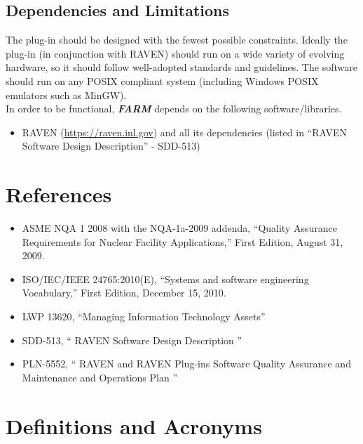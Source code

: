 \subsection{Dependencies and Limitations}
The plug-in should be designed with the fewest possible constraints. 
Ideally the  plug-in (in conjunction with RAVEN)
 should run on a wide variety of evolving hardware, 
so it should follow well-adopted standards and guidelines. The software
 should run on any POSIX compliant system (including Windows POSIX 
 emulators such as MinGW). 
\\In order to be functional, \textit{\textbf{FARM}} depends on the following software/libraries.
\begin{itemize}
  \item RAVEN (\url{https://raven.inl.gov}) and all its dependencies (listed in ``RAVEN Software Design Description'' - SDD-513)
\end{itemize}


\section{References}

\begin{itemize}

  \item ASME NQA 1 2008 with the NQA-1a-2009 addenda, ``Quality Assurance Requirements for Nuclear Facility Applications,'' First Edition, August 31, 2009.
  \item ISO/IEC/IEEE 24765:2010(E), ``Systems and software engineering Vocabulary,'' First Edition, December 15, 2010.
  \item LWP 13620, ``Managing Information Technology Assets''
  \item SDD-513, `` RAVEN Software Design Description ''
  \item PLN-5552, `` RAVEN and RAVEN Plug-ins Software Quality Assurance and Maintenance and Operations Plan ''
\end{itemize}


\section{Definitions and Acronyms}

